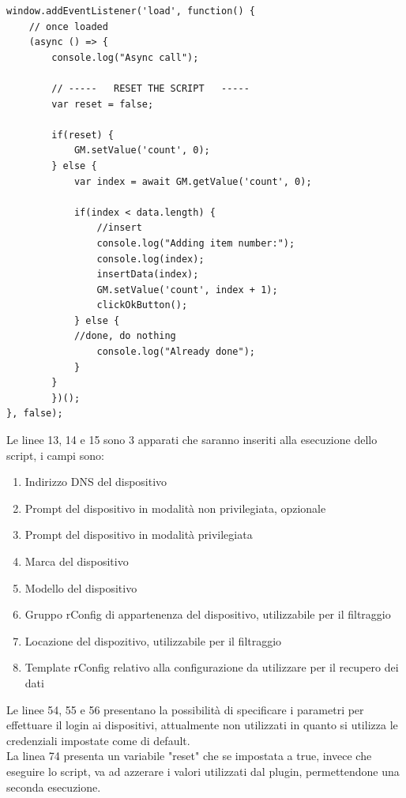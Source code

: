 \documentclass[Tesi.tex]{subfiles}
\begin{document}
\begin{lstlisting}[caption=Script GreaseMonkey di popolamento rConfig]
window.addEventListener('load', function() {
	// once loaded
	(async () => {
		console.log("Async call");
		
		// -----   RESET THE SCRIPT   -----
		var reset = false;
		
		if(reset) {
			GM.setValue('count', 0);
		} else {
			var index = await GM.getValue('count', 0);
			
			if(index < data.length) {
				//insert
				console.log("Adding item number:");
				console.log(index);
				insertData(index);
				GM.setValue('count', index + 1);
				clickOkButton();
			} else {
			//done, do nothing
				console.log("Already done");
			}   
		}
		})();
}, false);

\end{lstlisting}

Le linee 13, 14 e 15 sono 3 apparati che saranno inseriti alla esecuzione dello script, i campi sono:
\begin{enumerate}
	\item Indirizzo DNS del dispositivo
	\item Prompt del dispositivo in modalità non privilegiata, opzionale
	\item Prompt del dispositivo in modalità privilegiata
	\item Marca del dispositivo
	\item Modello del dispositivo
	\item Gruppo rConfig di appartenenza del dispositivo, utilizzabile per il filtraggio
	\item Locazione del dispozitivo, utilizzabile per il filtraggio
	\item Template rConfig relativo alla configurazione da utilizzare per il recupero dei dati
\end{enumerate}

Le linee 54, 55 e 56 presentano la possibilità di specificare i parametri per effettuare il login ai dispositivi, attualmente non utilizzati in quanto si utilizza le credenziali impostate come di default. \\
La linea 74 presenta un variabile "reset" che se impostata a true, invece che eseguire lo script, va ad azzerare i valori utilizzati dal plugin, permettendone una seconda esecuzione.
\end{document}
